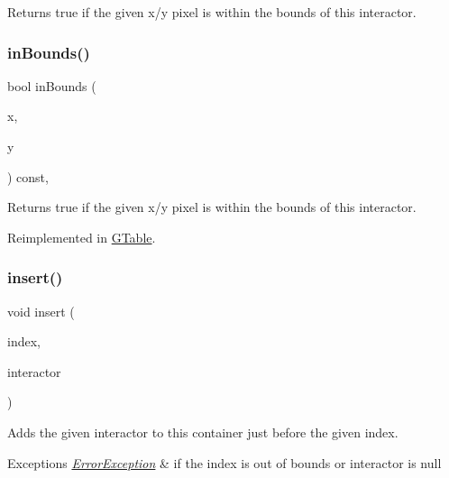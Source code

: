 Returns true if the given x/y pixel is within the bounds of this interactor. 

\mbox{\label{classGInteractor_ae6d7982c1c627b677a5e776ca86118ed}} 
\subsubsection{\texorpdfstring{in\+Bounds()}{inBounds()}\hspace{0.1cm}{\footnotesize\ttfamily [2/2]}}
{\footnotesize\ttfamily bool in\+Bounds (\begin{DoxyParamCaption}\item[{int}]{x,  }\item[{int}]{y }\end{DoxyParamCaption}) const\hspace{0.3cm}{\ttfamily [virtual]}, {\ttfamily [inherited]}}



Returns true if the given x/y pixel is within the bounds of this interactor. 



Reimplemented in \mbox{\hyperlink{classGTable_afa6b6241d2f7af75f2d1345f46acfc35}{G\+Table}}.

\mbox{\label{classGContainer_afffb8f789ff9a8466fbae5b846a0ebe7}} 
\subsubsection{\texorpdfstring{insert()}{insert()}\hspace{0.1cm}{\footnotesize\ttfamily [1/2]}}
{\footnotesize\ttfamily void insert (\begin{DoxyParamCaption}\item[{int}]{index,  }\item[{\mbox{\hyperlink{classGInteractor}{G\+Interactor}} $\ast$}]{interactor }\end{DoxyParamCaption})\hspace{0.3cm}{\ttfamily [virtual]}}



Adds the given interactor to this container just before the given index. 


\begin{DoxyExceptions}{Exceptions}
{\em \mbox{\hyperlink{classErrorException}{Error\+Exception}}} & if the index is out of bounds or interactor is null \\
\hline
\end{DoxyExceptions}
\mbox{\label{classGContainer_a2e9d7c6d9e6769d4cfd3293afe7e215c}} 
